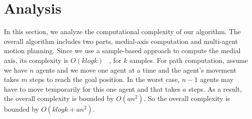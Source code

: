 \section{Analysis}
\vspace*{+0.15in}
In this section, we analyze the computational complexity of our algorithm. 
The overall algorithm includes two parts, medial-axis computation and multi-agent motion planning. Since we use a sample-based approach to compute the medial axis, its complexity is  $O(klogk)$  ~\cite{giesen2012medial}, for $k$ samples.
For path computation, assume we have $n$ agents and we move one agent at a time and the agent's movement takes $m$ steps to reach the goal position. In the worst case, $n-1$ agents may have to move temporarily for this one agent and that takes $a$ steps. As a result, the overall complexity is bounded by $O(a n^2)$. So the overall complexity is bounded by $O(klogk + an^2)$.
\vspace*{+0.15in}
